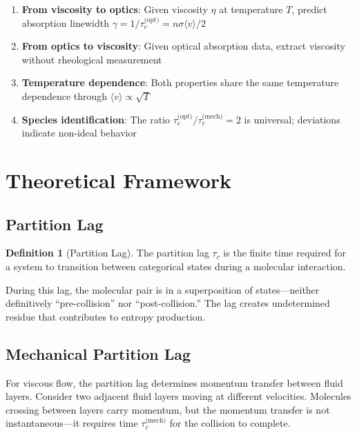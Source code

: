 \documentclass[twocolumn,10pt]{article}
\theoremstyle{definition}
\newtheorem{definition}[theorem]{Definition}
\theoremstyle{remark}
\begin{document}
\begin{enumerate}
\item \textbf{From viscosity to optics}: Given viscosity $\eta$ at temperature $T$, predict absorption linewidth $\gamma = 1/\tau_c^{\text{(opt)}} = n\sigma\langle v\rangle/2$

\item \textbf{From optics to viscosity}: Given optical absorption data, extract viscosity without rheological measurement

\item \textbf{Temperature dependence}: Both properties share the same temperature dependence through $\langle v \rangle \propto \sqrt{T}$

\item \textbf{Species identification}: The ratio $\tau_c^{\text{(opt)}}/\tau_c^{\text{(mech)}} = 2$ is universal; deviations indicate non-ideal behavior
\end{enumerate}

\section{Theoretical Framework}
\label{sec:theory}

\subsection{Partition Lag}

\begin{definition}[Partition Lag]
The partition lag $\tau_c$ is the finite time required for a system to transition between categorical states during a molecular interaction.
\end{definition}

During this lag, the molecular pair is in a superposition of states---neither definitively ``pre-collision'' nor ``post-collision.'' The lag creates undetermined residue that contributes to entropy production.

\subsection{Mechanical Partition Lag}

For viscous flow, the partition lag determines momentum transfer between fluid layers. Consider two adjacent fluid layers moving at different velocities. Molecules crossing between layers carry momentum, but the momentum transfer is not instantaneous---it requires time $\tau_c^{\text{(mech)}}$ for the collision to complete.
\end{document}
